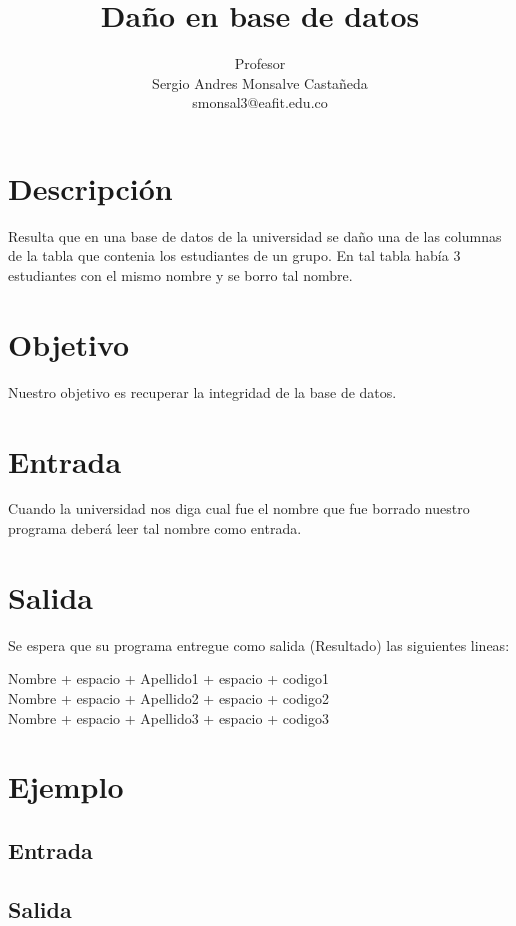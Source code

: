 \documentclass[11pt,letterpaper]{article}
\title{Daño en base de datos}
\author{
	Profesor\\
	Sergio Andres Monsalve Castañeda\\
	smonsal3@eafit.edu.co
}
\begin{document}
 
\pagestyle{fancyplain}
\fancyhf{}
\headheight=20pt %
\renewcommand{\headrulewidth}{0pt} %


\fancyfoot[c]{\thepage}

\maketitle

\begin{minipage}{3cm}
\end{minipage}


\section{Descripción}

Resulta que en una base de datos de la universidad se daño una de las columnas de la tabla que contenia los estudiantes de un grupo. En tal tabla había 3 estudiantes con el mismo nombre y se borro tal nombre.

\section{Objetivo}

Nuestro objetivo es recuperar la integridad de la base de datos.

\section{Entrada}

Cuando la universidad nos diga cual fue el nombre que fue borrado nuestro programa deberá leer tal nombre como entrada.

\section{Salida}

Se espera que su programa entregue como salida (Resultado) las siguientes lineas:

Nombre + espacio +  Apellido1 + espacio + codigo1 \\
Nombre + espacio +  Apellido2 + espacio + codigo2 \\
Nombre + espacio +  Apellido3 + espacio + codigo3 \\

\section{Ejemplo}
\subsection{Entrada}

\subsection{Salida}


%
%
\end{document}
